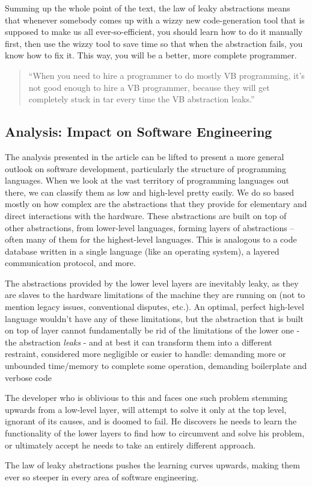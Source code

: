 \documentclass[12pt,a4paper,notitlepage]{article}
\begin{document}
Summing up the whole point of the text, the law of leaky abstractions means that whenever somebody comes up with a wizzy new code-generation tool that is supposed to make us all ever-so-efficient, you should learn how to do it manually first, then use the wizzy tool to save time so that when the abstraction fails, you know how to fix it.
This way, you will be a better, more complete programmer.

\begin{quote}
``When you need to hire a programmer to do mostly VB programming, it’s not good enough to hire a VB programmer, because they will get completely stuck in tar every time the VB abstraction leaks.''
\end{quote}

\subsection{Analysis: Impact on Software Engineering}

The analysis presented in the article can be lifted to present a more general outlook on software development, particularly the structure of programming languages.
When we look at the vast territory of programming languages out there, we can classify them as low and high-level pretty easily.
We do so based mostly on how complex are the abstractions that they provide for elementary and direct interactions with the hardware.
These abstractions are built on top of other abstractions, from lower-level languages, forming layers of abstractions -- often many of them for the highest-level languages.
This is analogous to a code database written in a single language (like an operating system), a layered communication protocol, and more.

The abstractions provided by the lower level layers are inevitably leaky, as they are slaves to the hardware limitations of the machine they are running on (not to mention legacy issues, conventional disputes, etc.).
An optimal, perfect high-level language wouldn’t have any of these limitations, but the abstraction that is built on top of layer cannot fundamentally be rid of the limitations of the lower one - the abstraction \emph{leaks} - and at best it can transform them into a different restraint, considered more negligible or easier to handle: demanding more or unbounded time/memory to complete some operation, demanding boilerplate and verbose code\textellipsis

The developer who is oblivious to this and faces one such problem stemming upwards from a low-level layer, will attempt to solve it only at the top level, ignorant of its causes, and is doomed to fail.
He discovers he needs to learn the functionality of the lower layers to find how to circumvent and solve his problem, or ultimately accept he needs to take an entirely different approach.

The law of leaky abstractions pushes the learning curves upwards, making them ever so steeper in every area of software engineering.
\end{document}
